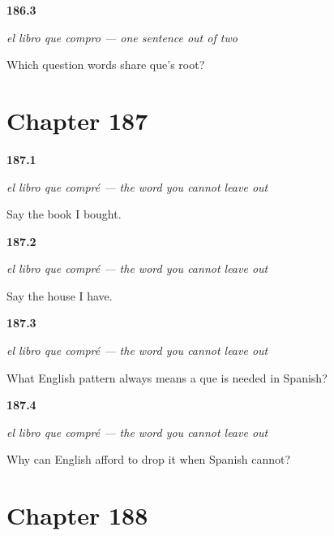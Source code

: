 \noindent\begin{minipage}[t]{\linewidth}
\raggedright
\hypertarget{review-ES-C53-que-relativo-family}{\textbf{186.3}} \emph{el libro que compro — one sentence out of two}\par
\small Which question words share que's root?
\end{minipage}\par\medskip

\section*{Chapter 187}

\noindent\begin{minipage}[t]{\linewidth}
\raggedright
\hypertarget{review-ES-C53-que-no-se-cae-book}{\textbf{187.1}} \emph{el libro que compré — the word you cannot leave out}\par
\small Say the book I bought.
\end{minipage}\par\medskip

\noindent\begin{minipage}[t]{\linewidth}
\raggedright
\hypertarget{review-ES-C53-que-no-se-cae-house}{\textbf{187.2}} \emph{el libro que compré — the word you cannot leave out}\par
\small Say the house I have.
\end{minipage}\par\medskip

\noindent\begin{minipage}[t]{\linewidth}
\raggedright
\hypertarget{review-ES-C53-que-no-se-cae-habit}{\textbf{187.3}} \emph{el libro que compré — the word you cannot leave out}\par
\small What English pattern always means a que is needed in Spanish?
\end{minipage}\par\medskip

\noindent\begin{minipage}[t]{\linewidth}
\raggedright
\hypertarget{review-ES-C53-que-no-se-cae-why}{\textbf{187.4}} \emph{el libro que compré — the word you cannot leave out}\par
\small Why can English afford to drop it when Spanish cannot?
\end{minipage}\par\medskip

\section*{Chapter 188}

